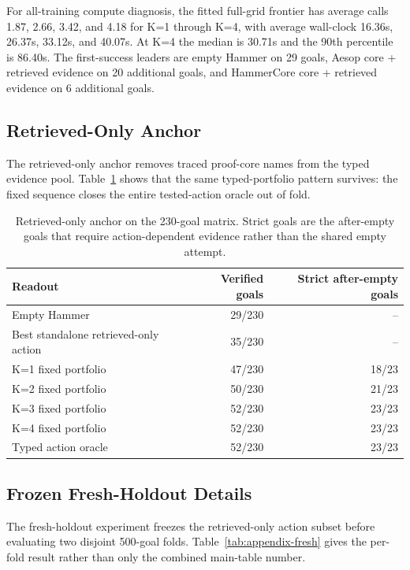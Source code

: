 \documentclass{article}
\begin{document}
For all-training compute diagnosis, the fitted full-grid frontier has average calls 1.87, 2.66, 3.42, and 4.18 for K=1 through K=4, with average wall-clock 16.36s, 26.37s, 33.12s, and 40.07s. At K=4 the median is 30.71s and the 90th percentile is 86.40s. The first-success leaders are empty Hammer on 29 goals, Aesop core + retrieved evidence on 20 additional goals, and HammerCore core + retrieved evidence on 6 additional goals.

\subsection{Retrieved-Only Anchor}

The retrieved-only anchor removes traced proof-core names from the typed evidence pool. Table~\ref{tab:appendix-retrieved-anchor} shows that the same typed-portfolio pattern survives: the fixed sequence closes the entire tested-action oracle out of fold.

\begin{table}[H]
\caption{Retrieved-only anchor on the 230-goal matrix. Strict goals are the after-empty goals that require action-dependent evidence rather than the shared empty attempt.}
\label{tab:appendix-retrieved-anchor}
\centering
\small
\begin{tabular}{lrr}
\toprule
Readout & Verified goals & Strict after-empty goals \\
\midrule
Empty Hammer & 29/230 & -- \\
Best standalone retrieved-only action & 35/230 & -- \\
K=1 fixed portfolio & 47/230 & 18/23 \\
K=2 fixed portfolio & 50/230 & 21/23 \\
K=3 fixed portfolio & 52/230 & 23/23 \\
K=4 fixed portfolio & 52/230 & 23/23 \\
Typed action oracle & 52/230 & 23/23 \\
\bottomrule
\end{tabular}
\end{table}

\subsection{Frozen Fresh-Holdout Details}

The fresh-holdout experiment freezes the retrieved-only action subset before evaluating two disjoint 500-goal folds. Table~\ref{tab:appendix-fresh} gives the per-fold result rather than only the combined main-table number.
\end{document}
